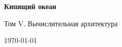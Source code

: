 \begin{titlepage}
  \centering
  \vspace*{2cm}
  {\LARGE\bfseries Кипящий океан\par}
  \vspace{0.8cm}
  {\Large Том V. Вычислительная архитектура\par}
  \vfill
  {\large \today\par}
\end{titlepage}
\cleardoublepage
\tableofcontents
\cleardoublepage
